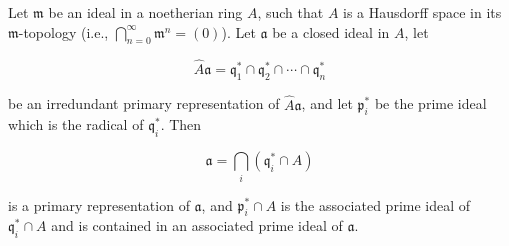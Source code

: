 Let $\mathfrak{m}$ be an ideal in a noetherian ring $A$, such that $A$ is a Hausdorff space in its $\mathfrak{m}$-topology (i.e., $\bigcap_{n=0}^{\infty} \mathfrak{m}^n = (0)$). Let $\mathfrak{a}$ be a closed ideal in $A$, let

$$\hat{A}\mathfrak{a} = \mathfrak{q}_1^* \cap \mathfrak{q}_2^* \cap \cdots \cap \mathfrak{q}_n^*$$

be an irredundant primary representation of $\hat{A}\mathfrak{a}$, and let $\mathfrak{p}_i^*$ be the prime ideal which is the radical of $\mathfrak{q}_i^*$. Then

$$\mathfrak{a} = \bigcap_i (\mathfrak{q}_i^* \cap A)$$

is a primary representation of $\mathfrak{a}$, and $\mathfrak{p}_i^* \cap A$ is the associated prime ideal of $\mathfrak{q}_i^* \cap A$ and is contained in an associated prime ideal of $\mathfrak{a}$.